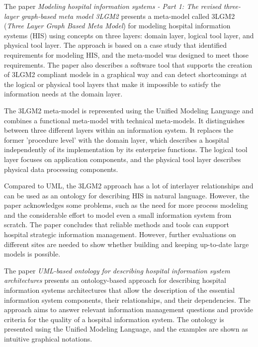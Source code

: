 The paper \textit{Modeling hospital information systems - Part 1: The revised three-layer graph-based meta model 3LGM2} presents a meta-model called 3LGM2 (\textit{Three Layer Graph Based Meta Model}) for modeling hospital information systems (HIS) using concepts on three layers: domain layer, logical tool layer, and physical tool layer. The approach is based on a case study that identified requirements for modeling HIS, and the meta-model was designed to meet those requirements. The paper also describes a software tool that supports the creation of 3LGM2 compliant models in a graphical way and can detect shortcomings at the logical or physical tool layers that make it impossible to satisfy the information needs at the domain layer.

The 3LGM2 meta-model is represented using the Unified Modeling Language and combines a functional meta-model with technical meta-models. It distinguishes between three different layers within an information system. It replaces the former 'procedure level' with the domain layer, which describes a hospital independently of its implementation by its enterprise functions. The logical tool layer focuses on application components, and the physical tool layer describes physical data processing components.

Compared to UML, the 3LGM2 approach has a lot of interlayer relationships and can be used as an ontology for describing HIS in natural language. However, the paper acknowledges some problems, such as the need for more process modeling and the considerable effort to model even a small information system from scratch. The paper concludes that reliable methods and tools can support hospital strategic information management. However, further evaluations on different sites are needed to show whether building and keeping up-to-date large models is possible.\cite{MHIS}

The paper \textit{UML-based ontology for describing hospital information system architectures} presents an ontology-based approach for describing hospital information systems architectures that allow the description of the essential information system components, their relationships, and their dependencies. The approach aims to answer relevant information management questions and provide criteria for the quality of a hospital information system. The ontology is presented using the Unified Modeling Language, and the examples are shown as intuitive graphical notations. 

